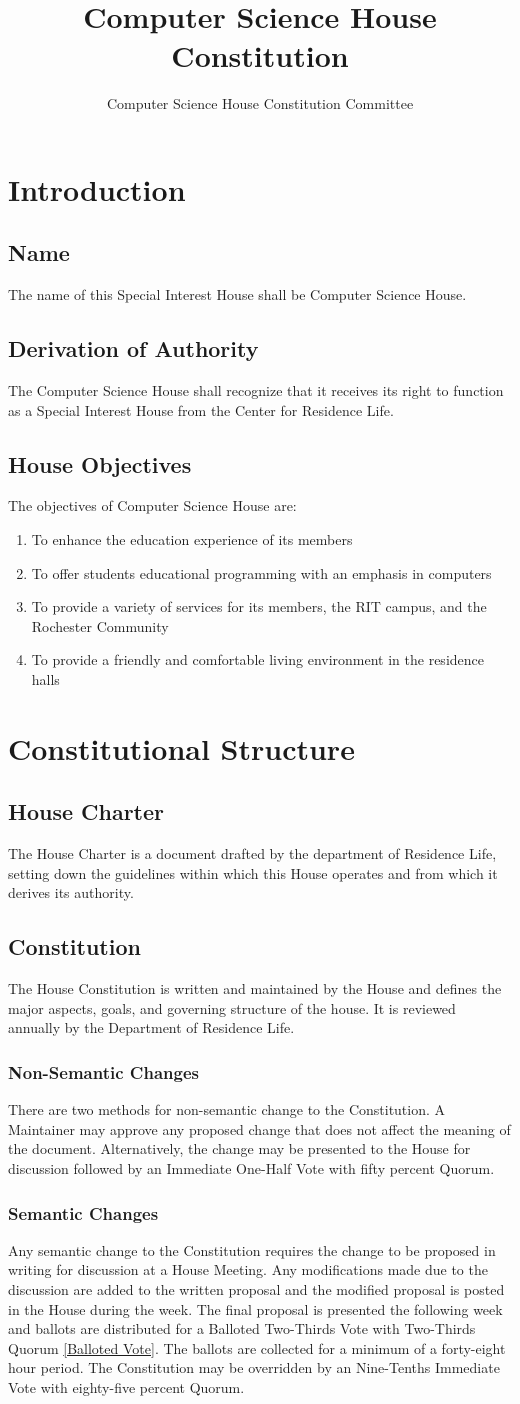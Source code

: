 \documentclass{article}
\title{Computer Science House Constitution}
\author{Computer Science House Constitution Committee}
\date{\datechanged}
\newcommand{\article}[1]{\section{#1} \label{#1}}
\newcommand{\asection}[1]{\subsection{#1} \label{#1}}
\newcommand{\asubsection}[1]{\subsubsection{#1} \label{#1}}
\begin{document}
\maketitle

\tableofcontents

\article{Introduction}

\asection{Name}
The name of this Special Interest House shall be Computer Science House.

\asection{Derivation of Authority}
The Computer Science House shall recognize that it receives its right to function as a Special Interest House from the Center for Residence Life.

\asection{House Objectives}
The objectives of Computer Science House are:
\begin{enumerate}
	\item To enhance the education experience of its members
	\item To offer students educational programming with an emphasis in computers
	\item To provide a variety of services for its members, the RIT campus, and the Rochester Community
	\item To provide a friendly and comfortable living environment in the residence halls
\end{enumerate}

\article{Constitutional Structure}

\asection{House Charter}
The House Charter is a document drafted by the department of Residence Life, setting down the guidelines within which this House operates and from which it derives its authority.

\asection{Constitution}
The House Constitution is written and maintained by the House and defines the major aspects, goals, and governing structure of the house.
It is reviewed annually by the Department of Residence Life.

\asubsection{Non-Semantic Changes}
There are two methods for non-semantic change to the Constitution.
A Maintainer may approve any proposed change that does not affect the meaning of the document.
Alternatively, the change may be presented to the House for discussion followed by an Immediate One-Half Vote with fifty percent Quorum.

\asubsection{Semantic Changes}
Any semantic change to the Constitution requires the change to be proposed in writing for discussion at a House Meeting.
Any modifications made due to the discussion are added to the written proposal and the modified proposal is posted in the House during the week.
The final proposal is presented the following week and ballots are distributed for a Balloted Two-Thirds Vote with Two-Thirds Quorum \ref{Balloted Vote}.
The ballots are collected for a minimum of a forty-eight hour period.
The Constitution may be overridden by an Nine-Tenths Immediate Vote with eighty-five percent Quorum.
\end{document}
